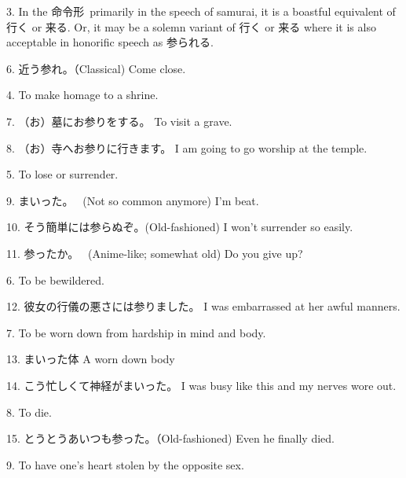 \par{3. In the 命令形 primarily in the speech of samurai, it is a boastful equivalent of 行く or 来る. Or, it may be a solemn variant of 行く or 来る where it is also acceptable in honorific speech as 参られる. }

\par{6. 近う参れ。（Classical) \hfill\break
Come close. }

\par{4. To make homage to a shrine. }

\par{7. （お）墓にお参りをする。 \hfill\break
To visit a grave. }

\par{8. （お）寺へお参りに行きます。 \hfill\break
I am going to go worship at the temple. \hfill\break
}

\par{5. To lose or surrender. }

\par{9. まいった。  (Not so common anymore) \hfill\break
I'm beat. \hfill\break
}

\par{10. そう簡単には参らぬぞ。(Old-fashioned) \hfill\break
I won't surrender so easily. \hfill\break
}

\par{11. 参ったか。  (Anime-like; somewhat old) \hfill\break
Do you give up? }

\par{6. To be bewildered. }

\par{12. 彼女の行儀の悪さには参りました。 \hfill\break
I was embarrassed at her awful manners. \hfill\break
 }

\par{7. To be worn down from hardship in mind and body. }

\par{13. まいった体 \hfill\break
A worn down body }

\par{14. こう忙しくて神経がまいった。 \hfill\break
I was busy like this and my nerves wore out. }

\par{8. To die. }

\par{15. とうとうあいつも参った。（Old-fashioned) \hfill\break
Even he finally died. \hfill\break
 }

\par{9. To have one's heart stolen by the opposite sex. }

